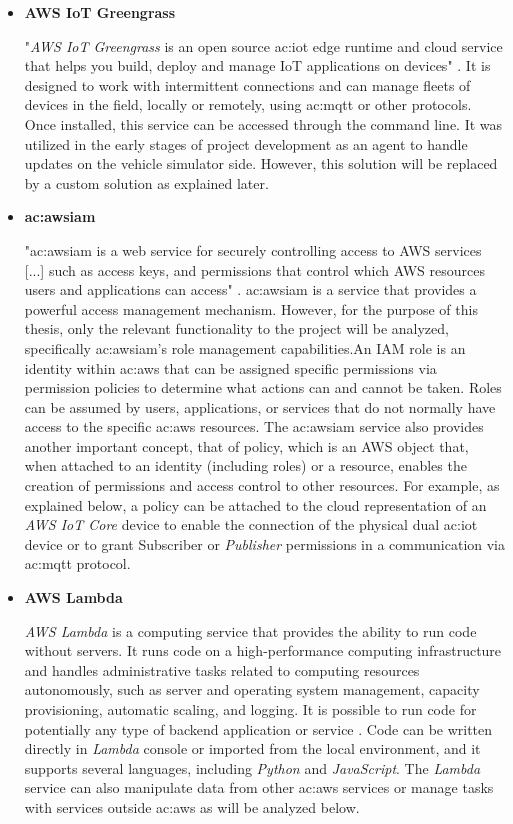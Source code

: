\begin{itemize}
    \item[] \textbf{AWS IoT Greengrass}
    
    "\textit{AWS IoT Greengrass} is an open source \gls{ac:iot} edge runtime and cloud service that helps you build, deploy and manage IoT applications on devices" \cite{AWSIoTGreengrass}. It is designed to work with intermittent connections and can manage fleets of devices in the field, locally or remotely, using \gls{ac:mqtt} or other protocols. Once installed, this service can be accessed through the command line. It was utilized in the early stages of project development as an agent to handle updates on the vehicle simulator side. However, this solution will be replaced by a custom solution as explained later.
    
    \item[] \textbf{\gls{ac:awsiam}}
    
    "\gls{ac:awsiam} is a web service for securely controlling access to AWS services [...] such as access keys, and permissions that control which AWS resources users and applications can access" \cite{AWSIAM}. \gls{ac:awsiam} is a service that provides a powerful access management mechanism. However, for the purpose of this thesis, only the relevant functionality to the project will be analyzed, specifically \gls{ac:awsiam}'s role management capabilities.An IAM role is an identity within \gls{ac:aws} that can be assigned specific permissions via permission policies to determine what actions can and cannot be taken. Roles can be assumed by users, applications, or services that do not normally have access to the specific \gls{ac:aws} resources. The \gls{ac:awsiam} service also provides another important concept, that of policy, which is an AWS object that, when attached to an identity (including roles) or a resource, enables the creation of permissions and access control to other resources. For example, as explained below, a policy can be attached to the cloud representation of an \textit{AWS IoT Core} device to enable the connection of the physical dual \gls{ac:iot} device or to grant Subscriber or \textit{Publisher} permissions in a communication via \gls{ac:mqtt} protocol.
    
    \item[] \textbf{AWS Lambda}
    
    \textit{AWS Lambda} is a computing service that provides the ability to run code without servers. It runs code on a high-performance computing infrastructure and handles administrative tasks related to computing resources autonomously, such as server and operating system management, capacity provisioning, automatic scaling, and logging. It is possible to run code for potentially any type of backend application or service \cite{AWSLambda}. Code can be written directly in \textit{Lambda} console or imported from the local environment, and it supports several languages, including \textit{Python} and \textit{JavaScript}. The \textit{Lambda} service can also manipulate data from other \gls{ac:aws} services or manage tasks with services outside \gls{ac:aws} as will be analyzed below.
    

\end{itemize}

